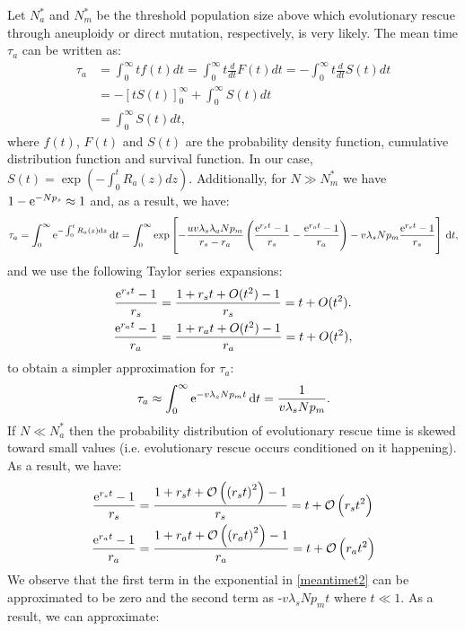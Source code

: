 \documentclass[12pt]{extarticle}
\renewcommand{\d}[1]{\ensuremath{\operatorname{d}\!{#1}}}
\renewcommand{\d}{{\rm d}}
\newcommand{\e}{{\rm e}}
\renewcommand{\Delta}{r}
\begin{document}
\begin{appendices}
Let $N_a^*$ and $N_m^*$ be the threshold population size above which evolutionary rescue through aneuploidy or direct mutation, respectively, is very likely. The mean time $\tau_a$ can be written as: %
\begin{align*}
\tau_a&=\int_0^\infty tf(t)dt=\int_0^\infty t\frac{d}{dt}F(t)dt=-\int_0^\infty t\frac{d}{dt}S(t)dt\\
&=-\left[tS(t)\right]_0^\infty+\int_0^\infty S(t)dt\\
&=\int_0^\infty S(t)dt,
\end{align*}
where $f(t)$, $F(t)$ and $S(t)$ are the probability density function, cumulative distribution function and survival function.
In our case, $S(t)=\exp\left(-\int_0^t R_a(z)dz\right)$.
Additionally, for $N\gg N_m^*$ we have $1-\e^{-Np_s}\approx1$ and, as a result, we have: %
\begin{align*}
\tau_a=\int_0^\infty\e^{-\int_0^t R_a\left(z\right)\d z}\,\d t=\int_0^\infty\exp\left[-\frac{uv\lambda_s\lambda_aNp_m}{\Delta_s-\Delta_a}\left(\frac{\e^{\Delta_s t}-1}{\Delta_s}-\frac{\e^{\Delta_a t}-1}{\Delta_a}\right)-v\lambda_sNp_m\frac{\e^{\Delta_s t}-1}{\Delta_s}\right]\,\d t,
\end{align*} %
and we use the following Taylor series expansions:
\begin{align*}
\frac{\e^{\Delta_s t}-1}{\Delta_s}&=\frac{1+\Delta_s t+O(t^2)-1}{\Delta_s}=t+O(t^2).\\ %
\frac{\e^{\Delta_a t}-1}{\Delta_a}&=\frac{1+\Delta_a t+O(t^2)-1}{\Delta_a}=t+O(t^2), %
\end{align*}
to obtain a simpler approximation for $\tau_a$:
\begin{align}\label{limitapprox3}
\tau_a\approx\int_0^\infty\e^{-v\lambda_sNp_m t}\,\d t=\frac{1}{v\lambda_sNp_m}. %
\end{align}
If $N\ll N_a^*$ then the probability distribution of evolutionary rescue time is skewed toward small values (i.e. evolutionary rescue occurs conditioned on it happening). As a result, we have: 
\begin{align*}
\frac{\e^{\Delta_s t}-1}{\Delta_s}&=\frac{1+\Delta_s t+\mathcal{O}\left(\left(\Delta_st\right)^2\right)-1}{\Delta_s}=t+\mathcal{O}\left(\Delta_st^2\right)\\
\frac{\e^{\Delta_a t}-1}{\Delta_a}&=\frac{1+\Delta_a t+\mathcal{O}\left(\left(\Delta_at\right)^2\right)-1}{\Delta_a}=t+\mathcal{O}\left(\Delta_at^2\right)
\end{align*}
We observe that the first term in the exponential in \cref{meantimet2} can be approximated to be zero and the second term as -$v\lambda_sNp_mt$ where $t\ll1$. As a result, we can approximate:

\end{appendices}
\end{document}

